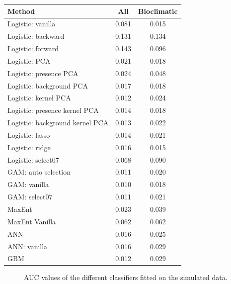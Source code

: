 \begin{table}
\center
\begin{tabular}{lcc}
\toprule
Method & All & Bioclimatic  \\
\midrule
Logistic: vanilla                 & 0.081 & 0.015 \\ 
Logistic: backward                & 0.131 & 0.134 \\
Logistic: forward                 & 0.143 & 0.096 \\
Logistic: PCA                     & 0.021 & 0.018 \\
Logistic: presence PCA            & 0.024 & 0.048 \\
Logistic: background PCA          & 0.017 & 0.018 \\ 
Logistic: kernel PCA              & 0.012 & 0.024 \\ 
Logistic: presence kernel PCA     & 0.014 & 0.018 \\ 
Logistic: background kernel PCA   & 0.013 & 0.022 \\ 
Logistic: lasso                   & 0.014 & 0.021 \\ 
Logistic: ridge                   & 0.016 & 0.015 \\ 
Logistic: select07                & 0.068 & 0.090 \\ 
GAM: auto selection               & 0.011 & 0.020 \\ 
GAM: vanilla                      & 0.010 & 0.018 \\ 
GAM: select07                     & 0.011 & 0.021 \\ 
MaxEnt                            & 0.023 & 0.039 \\
MaxEnt Vanilla                    & 0.062 & 0.062 \\
ANN                               & 0.016 & 0.025 \\
ANN: vanilla                      & 0.016 & 0.029 \\
GBM                               & 0.012 & 0.029 \\
\bottomrule
\end{tabular}
\end{table}

\begin{figure}[!htb]
\center
{}
\caption{\label{fig:PrAbAUC}AUC values of the different classifiers fitted on the simulated data.}
\end{figure}


